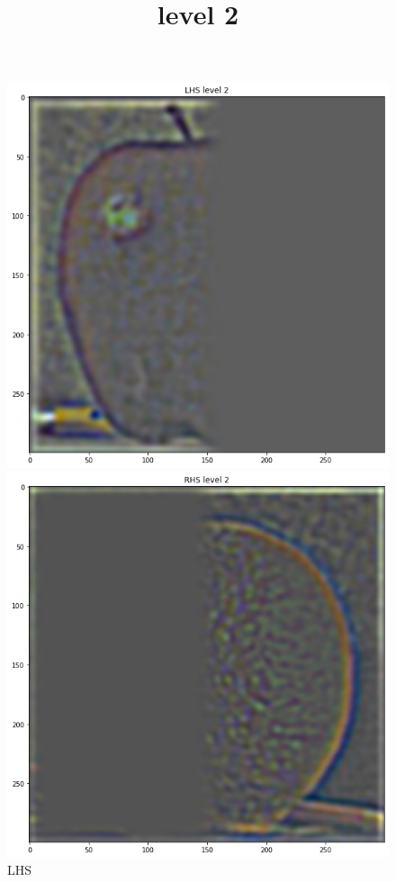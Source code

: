 \documentclass{article}
\begin{document}
\begin{figure}[!htb]
\title{level 2}
    \includegraphics[width=\linewidth]{LHS 2.png}
    \caption{LHS}
\endminipage
{}
    \includegraphics[width=\linewidth]{RHS 2.png}

\end{figure}
\end{document}
